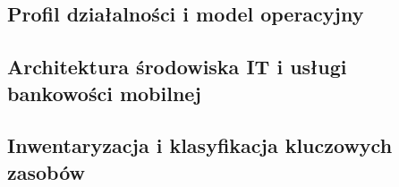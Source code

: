 \subsection{Profil działalności i model operacyjny}\label{subsec:profil-dzialalnosci}

\subsection{Architektura środowiska IT i usługi bankowości mobilnej}\label{subsec:architektura-srodowiska}

\subsection{Inwentaryzacja i klasyfikacja kluczowych zasobów}\label{subsec:kluczowe-zasoby}
